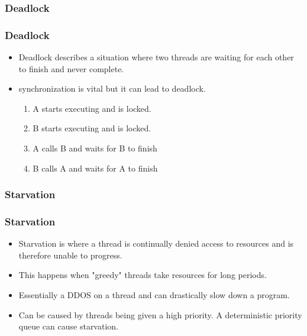 \documentclass{beamer}
\begin{document}
\subsubsection{Deadlock}
\begin{frame}
\frametitle{Deadlock}
\begin{itemize}
\item {\color{red} Deadlock} describes a situation where two threads are waiting for each other to finish and never complete.
\item {\color{blue} synchronization} is vital but it can lead to deadlock.
\begin{enumerate}
\item A starts executing and is locked.
\item B starts executing and is locked.
\item A calls B and waits for B to finish
\item B calls A and waits for A to finish
\end{enumerate}
\end{itemize}
\end{frame}
\subsubsection{Starvation}
\begin{frame}
\frametitle{Starvation}
\begin{itemize}
\item {\color{red} Starvation} is where a {\color{green} thread} is continually denied access to resources and is therefore unable to progress.
\item This happens when "greedy" threads take resources for long periods.
\item Essentially a DDOS on a {\color{green} thread} and can drastically slow down a program.
\item Can be caused by {\color{green} threads} being given a high priority. A deterministic priority queue can cause {\color{red} starvation}.
\end{itemize}
\end{frame}
\end{document}
